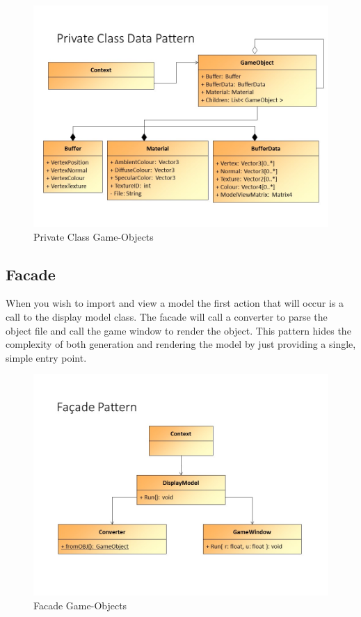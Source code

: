 \begin{figure}[!ht]
	\centering
	\includegraphics[scale=0.5]{Diagrams/Slide5.jpg}
	\caption{Private Class Game-Objects}
\end{figure}

\subsection{Facade}
When you wish to import and view a model the first action that will occur is a call to the display model class. The facade will call a converter to parse the object file and call the game window to render the object. This pattern hides the complexity of both generation and rendering the model by just providing a single, simple entry point.

\begin{figure}[!ht]
	\centering
	\includegraphics[scale=0.5]{Diagrams/Slide6.jpg}
	\caption{Facade Game-Objects}
\end{figure}

